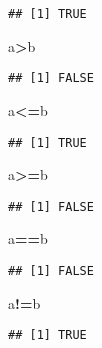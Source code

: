 \documentclass[
]{article}
\newenvironment{Shaded}{\begin{snugshade}}{\end{snugshade}}
\newcommand{\NormalTok}[1]{#1}
\newcommand{\SpecialCharTok}[1]{\textcolor[rgb]{0.81,0.36,0.00}{\textbf{#1}}}
\begin{document}
\begin{verbatim}
## [1] TRUE
\end{verbatim}

\begin{Shaded}
\begin{Highlighting}[]
\NormalTok{a}\SpecialCharTok{\textgreater{}}\NormalTok{b}
\end{Highlighting}
\end{Shaded}

\begin{verbatim}
## [1] FALSE
\end{verbatim}

\begin{Shaded}
\begin{Highlighting}[]
\NormalTok{a}\SpecialCharTok{\textless{}=}\NormalTok{b}
\end{Highlighting}
\end{Shaded}

\begin{verbatim}
## [1] TRUE
\end{verbatim}

\begin{Shaded}
\begin{Highlighting}[]
\NormalTok{a}\SpecialCharTok{\textgreater{}=}\NormalTok{b}
\end{Highlighting}
\end{Shaded}

\begin{verbatim}
## [1] FALSE
\end{verbatim}

\begin{Shaded}
\begin{Highlighting}[]
\NormalTok{a}\SpecialCharTok{==}\NormalTok{b}
\end{Highlighting}
\end{Shaded}

\begin{verbatim}
## [1] FALSE
\end{verbatim}

\begin{Shaded}
\begin{Highlighting}[]
\NormalTok{a}\SpecialCharTok{!=}\NormalTok{b}
\end{Highlighting}
\end{Shaded}

\begin{verbatim}
## [1] TRUE
\end{verbatim}
\end{document}
